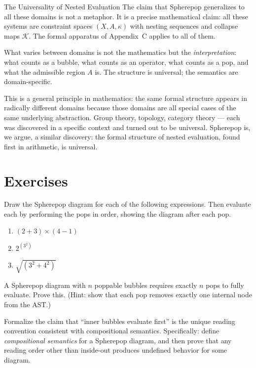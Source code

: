 \begin{conceptaside}{The Universality of Nested Evaluation}
  The claim that Spherepop generalizes to all these domains is not a
  metaphor. It is a precise mathematical claim: all these systems are
  constraint spaces $(X, A, \kappa)$ with nesting sequences and collapse
  maps $\mathcal{K}$. The formal apparatus of Appendix~C applies to all
  of them.

  What varies between domains is not the mathematics but the
  \emph{interpretation}: what counts as a bubble, what counts as an
  operator, what counts as a pop, and what the admissible region $A$
  is. The structure is universal; the semantics are domain-specific.

  This is a general principle in mathematics: the same formal structure
  appears in radically different domains because those domains are all
  special cases of the same underlying abstraction. Group theory,
  topology, category theory — each was discovered in a specific context
  and turned out to be universal. Spherepop is, we argue, a similar
  discovery: the formal structure of nested evaluation, found first in
  arithmetic, is universal.
\end{conceptaside}

\section*{Exercises}

\begin{exercise}
  Draw the Spherepop diagram for each of the following expressions.
  Then evaluate each by performing the pops in order, showing the
  diagram after each pop.
  \begin{enumerate}[label=(\alph*)]
    \item $(2 + 3) \times (4 - 1)$
    \item $2^{(3^2)}$
    \item $\sqrt{(3^2 + 4^2)}$
  \end{enumerate}
\end{exercise}

\begin{exercise}
  A Spherepop diagram with $n$ poppable bubbles requires exactly $n$
  pops to fully evaluate. Prove this. (Hint: show that each pop
  removes exactly one internal node from the AST.)
\end{exercise}

\begin{exercise}
  Formalize the claim that ``inner bubbles evaluate first'' is the
  unique reading convention consistent with compositional semantics.
  Specifically: define \emph{compositional semantics} for a Spherepop
  diagram, and then prove that any reading order other than inside-out
  produces undefined behavior for some diagram.
\end{exercise}

